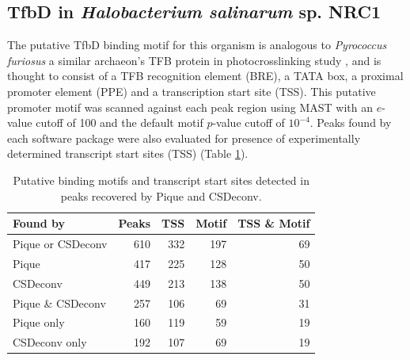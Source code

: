 \begin{refsection}
%

\subsection{TfbD in {\em Halobacterium salinarum} sp. NRC1}

The putative TfbD binding motif for this organism is analogous to {\em
  Pyrococcus furiosus} a similar archaeon's TFB protein in
photocrosslinking study \cite{tfb_promoter}, and is thought to consist
of a TFB recognition element (BRE), a TATA box, a proximal promoter
element (PPE) and a transcription start site (TSS). This putative
promoter motif was scanned against each peak region using MAST
\cite{MAST} with an $e$-value cutoff of 100 and the default motif
$p$-value cutoff of $10^{-4}$. Peaks found by each software package
were also evaluated for presence of experimentally determined
transcript start sites (TSS) \cite{halo_promoters} (Table
\ref{P_table1}).

\begin{table}
  \begin{center}
    \begin{tabular}{l r r r r}
      Found by & Peaks & TSS & Motif & TSS \& Motif \\
      \hline
      Pique or CSDeconv & 610 & 332 & 197 & 69 \\
      Pique             & 417 & 225 & 128 & 50 \\
      CSDeconv          & 449 & 213 & 138 & 50 \\
      Pique \& CSDeconv & 257 & 106 & 69  & 31 \\
      Pique only        & 160 & 119 & 59  & 19 \\
      CSDeconv only     & 192 & 107 & 69  & 19 \\
    \end{tabular}
  \end{center}
  \caption{Putative binding motifs and transcript start sites detected 
    in peaks recovered by Pique and CSDeconv.}\label{P_table1}
\end{table}


\end{refsection}
